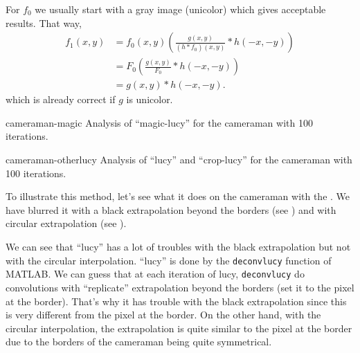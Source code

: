 For $f_0$ we usually start with a gray image (unicolor) which gives acceptable results.
That way,
\begin{align*}
  f_1(x,y) & = f_0(x,y)\left(\frac{g(x,y)}{(h*f_0)(x,y)} * h(-x,-y)\right)\\
               & = F_0\left(\frac{g(x,y)}{F_0} * h(-x,-y)\right)\\
               & = g(x,y) * h(-x,-y).
\end{align*}
which is already correct if $g$ is unicolor.

\begin{myfig}{cameraman-magic}
  {Analysis of ``magic-lucy'' for the cameraman with 100 iterations.}
\end{myfig}

\begin{myfig}{cameraman-otherlucy}
  {Analysis of ``lucy'' and ``crop-lucy'' for the cameraman with 100 iterations.}
\end{myfig}

To illustrate this method, let's see what it does on the cameraman
with the .
We have blurred it with a black extrapolation beyond the borders
(see ) and with circular extrapolation
(see ).

We can see that ``lucy'' has a lot of troubles with the black
extrapolation but not with the circular interpolation.
``lucy'' is done by the \lstinline|deconvlucy| function of MATLAB.
We can guess that at each iteration of lucy,
\lstinline|deconvlucy| do convolutions with ``replicate''
extrapolation beyond the borders (set it to the pixel at the border).
That's why it has trouble with the black extrapolation since this is
very different from the pixel at the border.
On the other hand, with the circular interpolation,
the extrapolation is quite similar to the pixel at the border due
to the borders of the cameraman being quite symmetrical.

